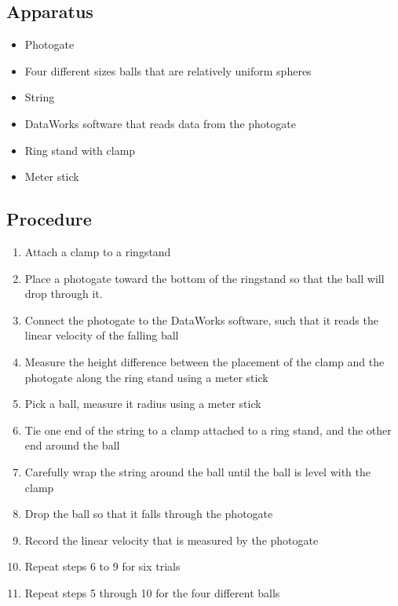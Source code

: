 \documentclass[10pt, letterpaper]{article}
\begin{document}
    \subsection{Apparatus}
    \begin{itemize}
      \item Photogate
      \item Four different sizes balls that are relatively uniform spheres
      \item String
      \item DataWorks software that reads data from the photogate
      \item Ring stand with clamp
      \item Meter stick
    \end{itemize}

    \subsection{Procedure}
    \begin{enumerate}
      \item Attach a clamp to a ringstand
      \item Place a photogate toward the bottom of the ringstand so that the ball will drop through it.
      \item Connect the photogate to the DataWorks software, such that it reads the linear velocity of the falling ball
      \item Measure the height difference between the placement of the clamp and the photogate along the ring stand using a meter stick
      \item Pick a ball, measure it radius using a meter stick
      \item Tie one end of the string to a clamp attached to a ring stand, and the other end around the ball
      \item Carefully wrap the string around the ball until the ball is level with the clamp
      \item Drop the ball so that it falls through the photogate
      \item Record the linear velocity that is measured by the photogate
      \item Repeat steps 6 to 9 for six trials
      \item Repeat steps 5 through 10 for the four different balls
    \end{enumerate}
\end{document}
